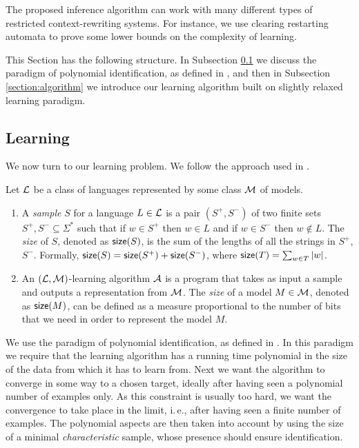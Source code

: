 The proposed inference algorithm can work with many different types of restricted context-rewriting systems. For instance, we use clearing restarting automata to prove some lower bounds on the complexity of learning.

This Section has the following structure. In Subsection \ref{section:learning} we discuss the paradigm of polynomial identification, as defined in \cite{Gold78, delaHiguera1997}, and then in Subsection \ref{section:algorithm} we introduce our learning algorithm built on slightly relaxed learning paradigm.

\subsection{Learning}\label{section:learning}

We now turn to our learning problem. We follow the approach used in \cite{Eyraud2007}.

\begin{definition}\label{definition:identification1}
Let $\textup{\sf $\mathcal{L}$}$ be a class of languages represented by some class $\textup{\sf $\mathcal{M}$}$ of models.
\begin{enumerate}
\item A \emph{sample} $S$ for a language $L \in \textup{\sf $\mathcal{L}$}$ is a pair $(S^+, S^-)$ of two finite sets $S^+, S^- \subseteq \Sigma^*$ such that if $w \in S^+$ then $w \in L$ and if $w \in S^-$ then $w \notin L$. The \emph{size} of $S$, denoted as $\textup{\sf size}(S)$, is the sum of the lengths of all the strings in $S^+$, $S^-$. Formally, $\textup{\sf size}(S) = \textup{\sf size}(S^+) + \textup{\sf size}(S^-)$, where $\textup{\sf size}(T) = \sum_{w \in T} |w|$.

\item An $(\textup{\sf $\mathcal{L}$}, \textup{\sf $\mathcal{M}$})$-learning algorithm $\textup{\sf $\mathcal{A}$}$ is a program that takes as input a sample and outputs a representation from $\textup{\sf $\mathcal{M}$}$. The \emph{size} of a model $M \in \textup{\sf $\mathcal{M}$}$, denoted as $\textup{\sf size}(M)$, can be defined as a measure proportional to the number of bits that we need in order to represent the model $M$.
\end{enumerate}
\end{definition}

We use the paradigm of polynomial identification, as defined in \cite{Gold78, delaHiguera1997}. In this paradigm we require that the learning algorithm has a running time polynomial in the size of the data from which it has to learn from. Next we want the algorithm to converge in some way to a chosen target, ideally after having seen a polynomial number of examples only. As this constraint is usually too hard, we want the convergence to take place in the limit, i.\,e., after having seen a finite number of examples. The polynomial aspects are then taken into account by using the size of a minimal \emph{characteristic} sample, whose presence should ensure identification.

